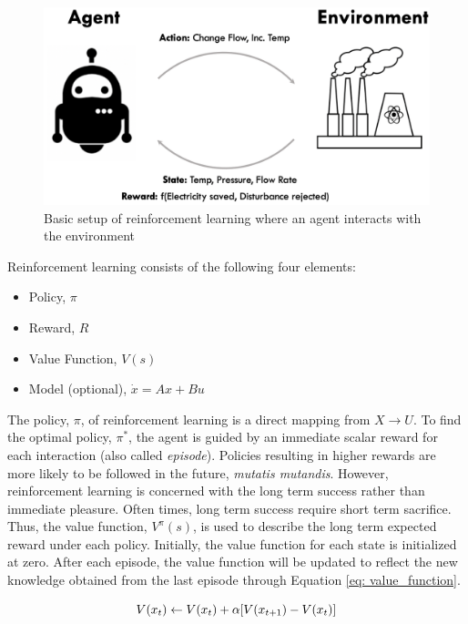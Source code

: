 \begin{figure}[h]
    \centering
    \includegraphics[scale=0.5]{images/RL.png}
    \caption{Basic setup of reinforcement learning where an agent interacts with the environment}
    \label{fig: simple_rl}

\end{figure}

Reinforcement learning consists of the following four elements:

\begin{itemize}
    \item Policy, $\pi$
    \item Reward, $R$
    \item Value Function, $V(s)$
    \item Model (optional), $\dot{x} = Ax + Bu$
\end{itemize}

The policy, $\pi$, of reinforcement learning is a direct mapping from $X \rightarrow U$.  To find the optimal policy, $\pi^*$, the agent is guided by an immediate scalar reward for each interaction (also called \textit{episode}). Policies resulting in higher rewards are more likely to be followed in the future, \textit{mutatis mutandis}.  However, reinforcement learning is concerned with the long term success rather than immediate pleasure. Often times, long term success require short term sacrifice.  Thus, the value function, $V^{\pi}(s)$, is used to describe the long term expected reward under each policy.  Initially, the value function for each state is initialized at zero.  After each episode, the value function will be updated to reflect the new knowledge obtained from the last episode through Equation \ref{eq: value_function}.

\begin{equation}
    \centering
    V(x_t) \leftarrow V(x_t) + \alpha [V(x_{t + 1}) - V(x_t)]
    \label{eq: value_function}
\end{equation}

